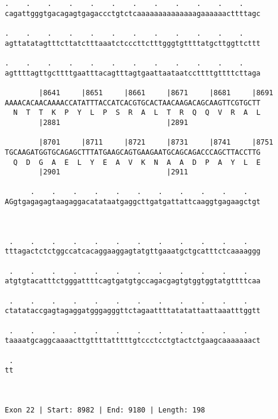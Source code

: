 \documentclass{article}
\begin{document}
\begin{Verbatim}
.    .    .    .    .    .    .    .    .    .    .    .    
cagattgggtgacagagtgagaccctgtctcaaaaaaaaaaaaaagaaaaaacttttagc
                                                            
.    .    .    .    .    .    .    .    .    .    .    .    
agttatatagtttcttatctttaaatctcccttctttgggtgttttatgcttggttcttt
                                                            
.    .    .    .    .    .    .    .    .    .    .    .    
agttttagttgcttttgaatttacagtttagtgaattaataatccttttgttttcttaga
                                                            
        |8641     |8651     |8661     |8671     |8681     |8691
AAAACACAACAAAACCATATTTACCATCACGTGCACTAACAAGACAGCAAGTTCGTGCTT
  N  T  T  K  P  Y  L  P  S  R  A  L  T  R  Q  Q  V  R  A  L
        |2881                         |2891                 
  
        |8701     |8711     |8721     |8731     |8741     |8751
TGCAAGATGGTGCAGAGCTTTATGAAGCAGTGAAGAATGCAGCAGACCCAGCTTACCTTG
  Q  D  G  A  E  L  Y  E  A  V  K  N  A  A  D  P  A  Y  L  E
        |2901                         |2911                 
  
      .    .    .    .    .    .    .    .    .    .    .   
AGgtgagagagtaagaggacatataatgaggcttgatgattattcaaggtgagaagctgt
                                                            
                                                            
  
 .    .    .    .    .    .    .    .    .    .    .    .   
tttagactctctggccatcacaggaaggagtatgttgaaatgctgcatttctcaaaaggg
                                                            
 .    .    .    .    .    .    .    .    .    .    .    .   
atgtgtacatttctgggattttcagtgatgtgccagacgagtgtggtggtatgttttcaa
                                                            
 .    .    .    .    .    .    .    .    .    .    .    .   
ctatataccgagtagaggatgggagggttctagaattttatatattaattaaatttggtt
                                                            
 .    .    .    .    .    .    .    .    .    .    .    .   
taaaatgcaggcaaaacttgttttatttttgtccctcctgtactctgaagcaaaaaaact
                                                            
 .
tt
  
  
 
Exon 22 | Start: 8982 | End: 9180 | Length: 198




\end{Verbatim}
\end{document}
